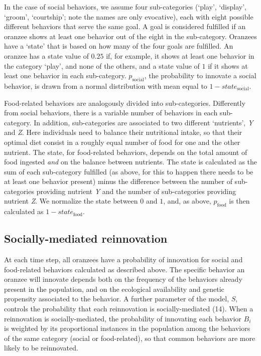 \documentclass[9pt,twocolumn,twoside,]{pnas-new}
\begin{document}
In the case of social behaviors, we assume four sub-categories (`play',
`display', `groom', `courtship'; note the names are only evocative),
each with eight possible different behaviors that serve the same goal. A
goal is considered fulfilled if an oranzee shows at least one behavior
out of the eight in the sub-category. Oranzees have a `state' that is
based on how many of the four goals are fulfilled. An oranzee has a
state value of \(0.25\) if, for example, it shows at least one behavior
in the category `play', and none of the others, and a state value of
\(1\) if it shows at least one behavior in each sub-category.
\(p_\text{social}\), the probability to innovate a social behavior, is
drawn from a normal distribution with mean equal to
\(1-state_\text{social}\).

Food-related behaviors are analogously divided into sub-categories.
Differently from social behaviors, there is a variable number of
behaviors in each sub-category. In addition, sub-categories are
associated to two different `nutrients', \emph{Y} and \emph{Z}. Here
individuals need to balance their nutritional intake, so that their
optimal diet consist in a roughly equal number of food for one and the
other nutrient. The state, for food-related behaviors, depends on the
total amount of food ingested \emph{and} on the balance between
nutrients. The state is calculated as the sum of each sub-category
fulfilled (as above, for this to happen there needs to be at least one
behavior present) minus the difference between the number of
sub-categories providing nutrient \emph{Y} and the number of
sub-categories providing nutrient \emph{Z}. We normalize the state
between \(0\) and \(1\), and, as above, \(p_\text{food}\) is then
calculated as \(1-state_\text{food}\).

\hypertarget{format}{%
\subsection*{Socially-mediated reinnovation}\label{format}}

At each time step, all oranzees have a probability of innovation for
social and food-related behaviors calculated as described above. The
specific behavior an oranzee will innovate depends both on the frequency
of the behaviors already present in the population, and on the
ecological availability and genetic propensity associated to the
behavior. A further parameter of the model, \(S\), controls the
probability that each reinnovation is socially-mediated (14). When a
reinnovation is socially-mediated, the probability of innovating each
behavior \(B_i\) is weighted by its proportional instances in the
population among the behaviors of the same category (social or
food-related), so that common behaviors are more likely to be
reinnovated.
\end{document}
